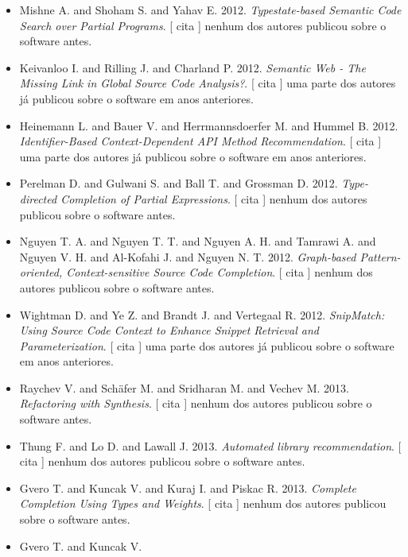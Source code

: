 \begin{itemize}
      [
          cita
      ]
nenhum dos autores publicou sobre o software antes.
\item Mishne A. and Shoham S. and Yahav E.
      2012.
        \textit{ Typestate-based Semantic Code Search over Partial Programs}.
      [
          cita
      ]
nenhum dos autores publicou sobre o software antes.
\item Keivanloo I. and Rilling J. and Charland P.
      2012.
        \textit{ Semantic Web - The Missing Link in Global Source Code Analysis?}.
      [
          cita
      ]
uma parte dos autores já publicou sobre o software em anos anteriores.
\item Heinemann L. and Bauer V. and Herrmannsdoerfer M. and Hummel B.
      2012.
        \textit{ Identifier-Based Context-Dependent API Method Recommendation}.
      [
          cita
      ]
uma parte dos autores já publicou sobre o software em anos anteriores.
\item Perelman D. and Gulwani S. and Ball T. and Grossman D.
      2012.
        \textit{ Type-directed Completion of Partial Expressions}.
      [
          cita
      ]
nenhum dos autores publicou sobre o software antes.
\item Nguyen T. A. and Nguyen T. T. and Nguyen A. H. and Tamrawi A. and Nguyen V. H. and Al-Kofahi J. and Nguyen N. T.
      2012.
        \textit{ Graph-based Pattern-oriented, Context-sensitive Source Code Completion}.
      [
          cita
      ]
nenhum dos autores publicou sobre o software antes.
\item Wightman D. and Ye Z. and Brandt J. and Vertegaal R.
      2012.
        \textit{ SnipMatch: Using Source Code Context to Enhance Snippet Retrieval and Parameterization}.
      [
          cita
      ]
uma parte dos autores já publicou sobre o software em anos anteriores.
\item Raychev V. and Sch\"{a}fer M. and Sridharan M. and Vechev M.
      2013.
        \textit{ Refactoring with Synthesis}.
      [
          cita
      ]
nenhum dos autores publicou sobre o software antes.
\item Thung F. and Lo D. and Lawall J.
      2013.
        \textit{ Automated library recommendation}.
      [
          cita
      ]
nenhum dos autores publicou sobre o software antes.
\item Gvero T. and Kuncak V. and Kuraj I. and Piskac R.
      2013.
        \textit{ Complete Completion Using Types and Weights}.
      [
          cita
      ]
nenhum dos autores publicou sobre o software antes.
\item Gvero T. and Kuncak V.

\end{itemize}
